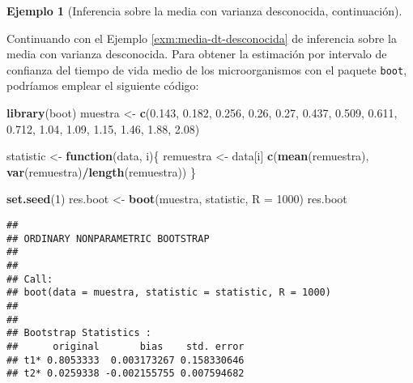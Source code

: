\documentclass[
]{book}
\newenvironment{Shaded}{\begin{snugshade}}{\end{snugshade}}
\newcommand{\ControlFlowTok}[1]{\textcolor[rgb]{0.13,0.29,0.53}{\textbf{#1}}}
\newcommand{\DataTypeTok}[1]{\textcolor[rgb]{0.13,0.29,0.53}{#1}}
\newcommand{\DecValTok}[1]{\textcolor[rgb]{0.00,0.00,0.81}{#1}}
\newcommand{\FloatTok}[1]{\textcolor[rgb]{0.00,0.00,0.81}{#1}}
\newcommand{\KeywordTok}[1]{\textcolor[rgb]{0.13,0.29,0.53}{\textbf{#1}}}
\newcommand{\NormalTok}[1]{#1}
\newcommand{\OperatorTok}[1]{\textcolor[rgb]{0.81,0.36,0.00}{\textbf{#1}}}
\newcommand{\StringTok}[1]{\textcolor[rgb]{0.31,0.60,0.02}{#1}}
\theoremstyle{break}
\theoremstyle{definition}
\theoremstyle{definition}
\newtheorem{example}{Ejemplo}[chapter]
\theoremstyle{definition}
\theoremstyle{remark}
\begin{document}
\begin{example}[Inferencia sobre la media con varianza desconocida, continuación]
\protect\hypertarget{exm:media-dt-desconocida-boot}{}{\label{exm:media-dt-desconocida-boot} \iffalse (Inferencia sobre la media con varianza desconocida, continuación) \fi{} } \vspace{0.5cm}

Continuando con el Ejemplo \ref{exm:media-dt-desconocida} de
inferencia sobre la media con varianza desconocida.
Para obtener la estimación por intervalo de confianza del tiempo de vida medio
de los microorganismos con el paquete \texttt{boot}, podríamos emplear
el siguiente código:
\end{example}

\begin{Shaded}
\begin{Highlighting}[]
\KeywordTok{library}\NormalTok{(boot)}
\NormalTok{muestra <-}\StringTok{ }\KeywordTok{c}\NormalTok{(}\FloatTok{0.143}\NormalTok{, }\FloatTok{0.182}\NormalTok{, }\FloatTok{0.256}\NormalTok{, }\FloatTok{0.26}\NormalTok{, }\FloatTok{0.27}\NormalTok{, }\FloatTok{0.437}\NormalTok{, }\FloatTok{0.509}\NormalTok{, }
             \FloatTok{0.611}\NormalTok{, }\FloatTok{0.712}\NormalTok{, }\FloatTok{1.04}\NormalTok{, }\FloatTok{1.09}\NormalTok{, }\FloatTok{1.15}\NormalTok{, }\FloatTok{1.46}\NormalTok{, }\FloatTok{1.88}\NormalTok{, }\FloatTok{2.08}\NormalTok{)}

\NormalTok{statistic <-}\StringTok{ }\ControlFlowTok{function}\NormalTok{(data, i)\{}
\NormalTok{  remuestra <-}\StringTok{ }\NormalTok{data[i]}
  \KeywordTok{c}\NormalTok{(}\KeywordTok{mean}\NormalTok{(remuestra), }\KeywordTok{var}\NormalTok{(remuestra)}\OperatorTok{/}\KeywordTok{length}\NormalTok{(remuestra))}
\NormalTok{\}}

\KeywordTok{set.seed}\NormalTok{(}\DecValTok{1}\NormalTok{)}
\NormalTok{res.boot <-}\StringTok{ }\KeywordTok{boot}\NormalTok{(muestra, statistic, }\DataTypeTok{R =} \DecValTok{1000}\NormalTok{)}
\NormalTok{res.boot}
\end{Highlighting}
\end{Shaded}

\begin{verbatim}
## 
## ORDINARY NONPARAMETRIC BOOTSTRAP
## 
## 
## Call:
## boot(data = muestra, statistic = statistic, R = 1000)
## 
## 
## Bootstrap Statistics :
##      original       bias    std. error
## t1* 0.8053333  0.003173267 0.158330646
## t2* 0.0259338 -0.002155755 0.007594682
\end{verbatim}
\end{document}
